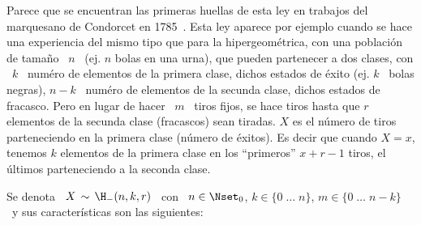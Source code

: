 \label{Sssec:MP:HipergeometricaNegativa}

Parece  que se  encuentran las  primeras  huellas de  esta ley  en trabajos  del
marquesano  de Condorcet  en 1785~\cite{Con85}.   Esta ley  aparece  por ejemplo
cuando se hace  una experiencia del mismo tipo que  para la hipergeom\'etrica, con
una poblaci\'on  de tama\~no \ $n$  \ (ej.  $n$  bolas en una urna),  que pueden
partenecer a dos clases, con \ $k$  \ num\'ero de elementos de la primera clase,
dichos  estados de  \'exito  (ej.  $k$  \  bolas negras),  $n-k$  \ num\'ero  de
elementos de  la secunda clase,  dichos estados de  fracasco.  Pero en  lugar de
hacer \ $m$ \  tiros fijos, se hace tiros hasta que  $r$ elementos de la secunda
clase (fracascos) sean tiradas.  $X$ es el n\'umero de tiros parteneciendo en la
primera clase (n\'umero  de \'exitos). Es decir que cuando $X  = x$, tenemos $k$
elementos de  la primera clase en  los ``primeros'' $x+r-1$  tiros, el \'ultimos
parteneciendo a la seconda clase.

Se denota \ $X \,  \sim \, \H_-(n,k,r)$ \ con \ $n \in \Nset_0$,  \quad $k \in \{ 0 \;
\ldots \; n \}$, \quad $m \in \{  0 \; \ldots \; n-k \}$ \ y sus caracter\'isticas
son las siguientes:

